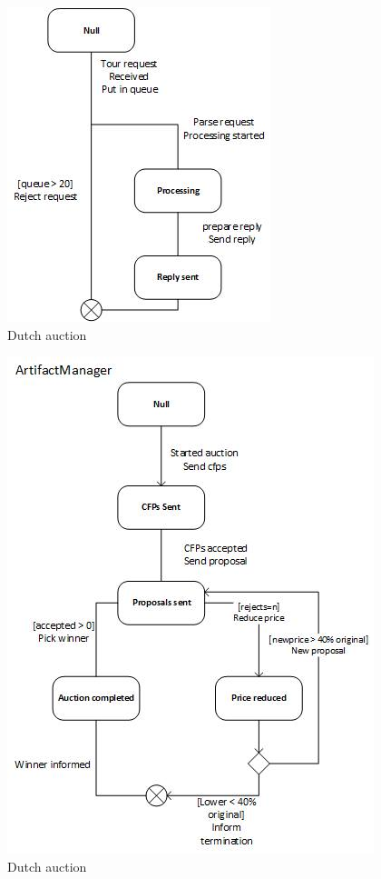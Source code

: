 \documentclass[a4paper, 11pt]{article}
\begin{document}
\begin{figure}[H]
	\caption{Dutch auction}
	\centering
	\includegraphics[scale=0.9]{./images/curator2UML.jpg}
\end{figure}
\begin{figure}[H]
	\caption{Dutch auction}
	\centering
	\includegraphics[scale=0.9]{./images/artifactmanagerUML.jpg}
\end{figure}
\end{document}
